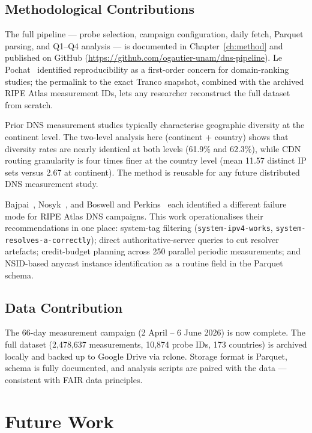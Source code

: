 \bigskip
\subsection{Methodological Contributions}
\label{subsec:5.3.2}

The full pipeline --- probe selection, campaign configuration, daily fetch, Parquet parsing, and Q1--Q4 analysis --- is documented in Chapter~\ref{ch:method} and published on GitHub (\url{https://github.com/ogautier-unam/dns-pipeline}). Le Pochat~\cite{LePochat2019} identified reproducibility as a first-order concern for domain-ranking studies; the permalink to the exact Tranco snapshot, combined with the archived RIPE Atlas measurement IDs, lets any researcher reconstruct the full dataset from scratch.

Prior \ac{DNS} measurement studies typically characterise geographic diversity at the continent level. The two-level analysis here (continent + country) shows that diversity rates are nearly identical at both levels (61.9\% and 62.3\%), while \ac{CDN} routing granularity is four times finer at the country level (mean 11.57 distinct \ac{IP} sets versus 2.67 at continent). The method is reusable for any future distributed \ac{DNS} measurement study.

Bajpai~\cite{Bajpai2017}, Nosyk~\cite{Nosyk2025}, and Boswell and Perkins~\cite{Boswell2024} each identified a different failure mode for RIPE Atlas \ac{DNS} campaigns. This work operationalises their recommendations in one place: system-tag filtering (\texttt{system-ipv4-works}, \texttt{system-resolves-a-correctly}); direct authoritative-server queries to cut resolver artefacts; credit-budget planning across 250 parallel periodic measurements; and \ac{NSID}-based anycast instance identification as a routine field in the Parquet schema.

\bigskip
\subsection{Data Contribution}
\label{subsec:5.3.3}

The 66-day measurement campaign (2 April -- 6 June 2026) is now complete. The full dataset (2,478,637 measurements, 10,874 probe IDs, 173 countries) is archived locally and backed up to Google Drive via rclone. Storage format is Parquet, schema is fully documented, and analysis scripts are paired with the data --- consistent with \ac{FAIR} data principles.

\bigskip
\section{Future Work}
\label{sec:5.4}

